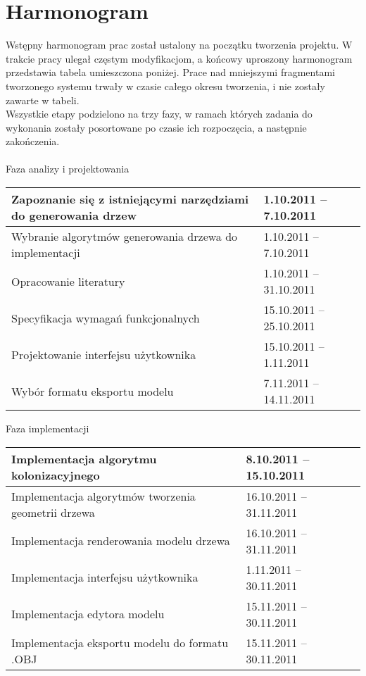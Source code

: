 \section{Harmonogram}
Wstępny harmonogram prac został ustalony na początku tworzenia projektu. W trakcie pracy ulegał częstym modyfikacjom, a końcowy uproszony harmonogram przedstawia tabela umieszczona poniżej. Prace nad mniejszymi fragmentami
tworzonego systemu trwały w czasie całego okresu tworzenia, i nie zostały zawarte w tabeli. 
\\\indent Wszystkie etapy podzielono na trzy fazy, w ramach których zadania do wykonania zostały posortowane
po czasie ich rozpoczęcia, a następnie zakończenia.\\ \\
    \indent Faza analizy i projektowania
	\begin{longtable}{|p{85mm}|p{42mm}|} \hline
	

    Zapoznanie się z istniejącymi narzędziami do generowania drzew &
    1.10.2011 -- 7.10.2011
    
    \\ \hline
    Wybranie algorytmów generowania drzewa do implementacji&
    1.10.2011 -- 7.10.2011
    \\ \hline

    Opracowanie literatury&
    1.10.2011 -- 31.10.2011
    \\ \hline

    Specyfikacja wymagań funkcjonalnych&
    15.10.2011 -- 25.10.2011
    \\ \hline
    
    Projektowanie interfejsu użytkownika &
    15.10.2011 -- 1.11.2011
    \\ \hline

    Wybór formatu eksportu modelu &
    7.11.2011 -- 14.11.2011
        \\ \hline

    
    \end{longtable}
	
     Faza implementacji
    \begin{longtable}{|p{85mm}|p{42mm}|} \hline
    Implementacja algorytmu kolonizacyjnego &
    8.10.2011 -- 15.10.2011
    \\ \hline

    Implementacja algorytmów tworzenia geometrii drzewa &
    16.10.2011 -- 31.11.2011 
    \\ \hline

    Implementacja renderowania modelu drzewa &
    16.10.2011 -- 31.11.2011
    \\ \hline

    Implementacja interfejsu użytkownika &
    1.11.2011 -- 30.11.2011
    \\ \hline

    Implementacja edytora modelu &
    15.11.2011 -- 30.11.2011
    \\ \hline

    Implementacja eksportu modelu do formatu .OBJ&
    15.11.2011 -- 30.11.2011
    \\ \hline
	
   
    
    \end{longtable}
	
